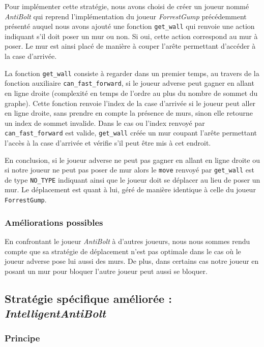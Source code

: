 \documentclass[11pt]{article}
\begin{document}
Pour implémenter cette stratégie, nous avons choisi de créer un joueur nommé \textit{AntiBolt} qui reprend l'implémentation du joueur \textit{ForrestGump} précédemment présenté auquel nous avons ajouté une fonction \texttt{get\_wall} qui renvoie une action indiquant s'il doit poser un mur ou non. Si oui, cette action correspond au mur à poser. Le mur est ainsi placé de manière à couper l'arête permettant d'accéder à la case d'arrivée. 

La fonction \texttt{get\_wall} consiste à regarder dans un premier temps, au travers de la fonction auxiliaire \texttt{can\_fast\_forward}, si le joueur adverse peut gagner en allant en ligne droite (complexité en temps  de l'ordre au plus du nombre de sommet du graphe). Cette fonction renvoie l'index de la case d'arrivée si le joueur peut aller en ligne droite, sans prendre en compte la présence de murs, sinon elle retourne un index de sommet invalide.
Dans le cas ou l'index renvoyé par \texttt{can\_fast\_forward} est valide, \texttt{get\_wall} créée un mur coupant l'arête permettant l'accès à la case d'arrivée et vérifie s'il peut être mis à cet endroit.

En conclusion, si le joueur adverse ne peut pas gagner en allant en ligne droite ou si notre joueur ne peut pas poser de mur alors le \texttt{move} renvoyé par \texttt{get\_wall} est de type \texttt{NO\_TYPE} indiquant ainsi que le joueur doit se déplacer au lieu de poser un mur. Le déplacement est quant à lui, géré de manière identique à celle du joueur \texttt{ForrestGump}. 

\subsubsection{Améliorations possibles}

En confrontant le joueur \textit{AntiBolt} à d'autres joueurs, nous nous sommes rendu compte que sa stratégie de déplacement n'est pas optimale dans le cas où le joueur adverse pose lui aussi des murs. De plus, dans certains cas notre joueur en posant un mur pour bloquer l'autre joueur peut aussi se bloquer. 

\subsection{Stratégie spécifique améliorée : \textit{IntelligentAntiBolt}}

\subsubsection{Principe}
\end{document}
